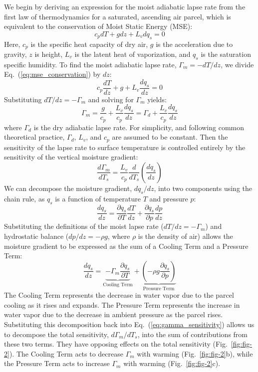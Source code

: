 \documentclass[draft]{ametsocV6.1}
\begin{document}
We begin by deriving an expression for the moist adiabatic lapse rate from the first law of thermodynamics for a saturated, ascending air parcel, which is equivalent to the conservation of Moist Static Energy (MSE):
\begin{equation}
c_p dT+gdz+L_v dq_s=0 \label{eq:mse_conservation}
\end{equation}
Here, $c_p$ is the specific heat capacity of dry air, $g$ is the acceleration due to gravity, $z$ is height, $L_v$ is the latent heat of vaporization, and $q_s$ is the saturation specific humidity. To find the moist adiabatic lapse rate, $\Gamma_m=-dT/dz$, we divide Eq.~(\ref{eq:mse_conservation}) by $dz$:
\begin{equation}
c_p \frac{dT}{dz}+g+L_v\frac{dq_s}{dz}=0 \label{eq:mse_dz}
\end{equation}
Substituting $dT/dz=-\Gamma_m$ and solving for $\Gamma_m$ yields:
\begin{equation}
\Gamma_m=\frac{g}{c_p}+\frac{L_v}{c_p}\frac{dq_s}{dz}=\Gamma_d+\frac{L_v}{c_p}\frac{dq_s}{dz} \label{eq:gamma_m}
\end{equation}
where $\Gamma_d$ is the dry adiabatic lapse rate. For simplicity, and following common theoretical practice, $\Gamma_d$, $L_v$, and $c_p$ are assumed to be constant. Then the sensitivity of the lapse rate to surface temperature is controlled entirely by the sensitivity of the vertical moisture gradient:
\begin{equation}
\frac{d\Gamma_m}{dT_s}=\frac{L_v}{c_p}\frac{d}{dT_s}\left(\frac{dq_s}{dz}\right) \label{eq:gamma_sensitivity}
\end{equation}
We can decompose the moisture gradient, $dq_s/dz$, into two components using the chain rule, as $q_s$ is a function of temperature $T$ and pressure $p$:
\begin{equation}
\frac{dq_s}{dz}=\frac{\partial q_s}{\partial T}\frac{dT}{dz}+\frac{\partial q_s}{\partial p}\frac{dp}{dz} \label{eq:dqs_dz_chain}
\end{equation}
Substituting the definitions of the moist lapse rate ($dT/dz=-\Gamma_m$) and hydrostatic balance ($dp/dz=-\rho g$, where $\rho$ is the density of air) allows the moisture gradient to be expressed as the sum of a Cooling Term and a Pressure Term:
\begin{equation}
\frac{dq_s}{dz} = \underbrace{-\Gamma_m\frac{\partial q_s}{\partial T}}_{\text{Cooling Term}} + \underbrace{\left(-\rho g\frac{\partial q_s}{\partial p}\right)}_{\text{Pressure Term}} \label{eq:dqs_dz_terms}
\end{equation}
The Cooling Term represents the decrease in water vapor due to the parcel cooling as it rises and expands. The Pressure Term represents the increase in water vapor due to the decrease in ambient pressure as the parcel rises. Substituting this decomposition back into Eq.~(\ref{eq:gamma_sensitivity}) allows us to decompose the total sensitivity, $d\Gamma_m/dT_s$, into the sum of contributions from these two terms. They have opposing effects on the total sensitivity (Fig.~\ref{fig:fig-2}). The Cooling Term acts to decrease $\Gamma_m$ with warming (Fig.~\ref{fig:fig-2}b), while the Pressure Term acts to increase $\Gamma_m$ with warming (Fig.~\ref{fig:fig-2}c).
\end{document}
